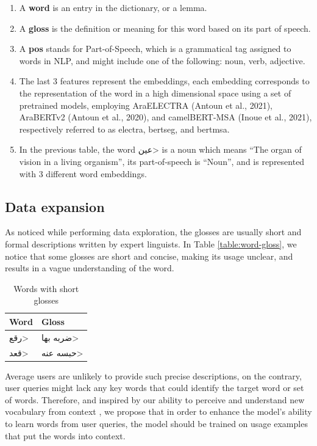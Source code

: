 \documentclass[15pt]{article}
\begin{document}
\begin{enumerate}
    \item A \textbf{word} is an entry in the dictionary, or a lemma.
    \item A \textbf{gloss} is the definition or meaning for this word based on its part of speech.
    \item A \textbf{pos} stands for Part-of-Speech, which is a grammatical tag assigned to words in NLP, and might include one of the following: noun, verb, adjective.
    \item The last 3 features represent the embeddings, each embedding corresponds to the representation of the word in a high dimensional space using a set of pretrained models, employing AraELECTRA (Antoun et al., 2021), AraBERTv2 (Antoun et al., 2020), and camelBERT-MSA (Inoue et al., 2021), respectively referred to as electra, bertseg, and bertmsa.
    \item In the previous table, the word \<عين> is a noun which means “The organ of vision in a living organism”, its part-of-speech is “Noun”, and is represented with 3 different word embeddings.
\end{enumerate}

\subsection{Data expansion}

As noticed while performing data exploration, the glosses are usually short and formal descriptions written by expert linguists. In Table \ref{table:word-gloss}, we notice that some glosses are short and concise, making its usage unclear, and results in a vague understanding of the word.

\begin{table}[H]
    \centering
    \caption{Words with short glosses}
    \label{table:word-short-gloss}
    \renewcommand{\arraystretch}{1.5}%
    \begin{tabularx}{\textwidth}{|X|X|}
        \hline
        \textbf{Word} & \textbf{Gloss} \\
        \hline
        \<رقع> & \<ضربه بها> \\
        \hline
        \<قعد> & \<حبسه عنه> \\
        \hline
    \end{tabularx}
\end{table}

Average users are unlikely to provide such precise descriptions, on the contrary, user queries might lack any key words that could identify the target word or set of words. Therefore, and inspired by our ability to perceive and understand new vocabulary from context \cite{killian1995}, we propose that in order to enhance the model’s ability to learn words from user queries, the model should be trained on usage examples that put the words into context.
\end{document}
